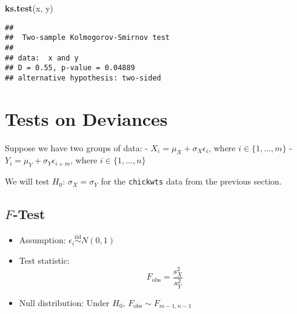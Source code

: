 \documentclass[
]{book}
\newenvironment{Shaded}{\begin{snugshade}}{\end{snugshade}}
\newcommand{\KeywordTok}[1]{\textcolor[rgb]{0.13,0.29,0.53}{\textbf{#1}}}
\newcommand{\NormalTok}[1]{#1}
\providecommand{\tightlist}{%
  \setlength{\itemsep}{0pt}\setlength{\parskip}{0pt}}
\begin{document}
\begin{Shaded}
\begin{Highlighting}[]
\KeywordTok{ks.test}\NormalTok{(x, y)}
\end{Highlighting}
\end{Shaded}

\begin{verbatim}
## 
##  Two-sample Kolmogorov-Smirnov test
## 
## data:  x and y
## D = 0.55, p-value = 0.04889
## alternative hypothesis: two-sided
\end{verbatim}

\hypertarget{tests-on-deviances}{%
\section{Tests on Deviances}\label{tests-on-deviances}}

Suppose we have two groups of data:
- \(X_i = \mu_X + \sigma_X \epsilon_i\), where \(i \in \{1, \dots, m\}\)
- \(Y_i = \mu_Y + \sigma_Y \epsilon_{i+m}\), where \(i \in \{1, \dots, n\}\)

We will test \(H_0\): \(\sigma_X = \sigma_Y\)
for the \texttt{chickwts} data from the previous section.

\hypertarget{f-test}{%
\subsection{\texorpdfstring{\(F\)-Test}{F-Test}}\label{f-test}}

\begin{itemize}
\tightlist
\item
  Assumption: \(\epsilon_i \overset{\mathrm{iid}} \sim N(0,1)\)
\item
  Test statistic:
  \[F_{\mathrm{obs}} = \frac{s_X^2}{s_Y^2}\]
\item
  Null distribution:
  Under \(H_0\), \(F_{\mathrm{obs}} \sim F_{m-1, n-1}\)
\end{itemize}
\end{document}
